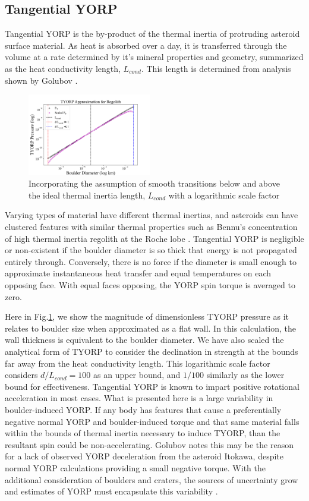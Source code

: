 \subsection{Tangential YORP}
Tangential YORP is the by-product of the thermal inertia of protruding asteroid surface material. As heat is absorbed over a day, it is transferred through the volume at a rate determined by it's mineral properties and geometry, summarized as the heat conductivity length, $L_{cond}$. This length is determined from analysis shown by Golubov \cite{Golubov2012}. 
\begin{figure}[H]
    \centering
    \includegraphics[width=0.48\textwidth]{fig/tyorp_regolith.png}
    \caption{Incorporating the assumption of smooth transitions below and above the ideal thermal inertia length, $L_{cond}$ with a logarithmic scale factor}
    \label{fig:tyorp_regolith}
\end{figure}

Varying types of material have different thermal inertias, and asteroids can have clustered features with similar thermal properties such as Bennu's concentration of high thermal inertia regolith at the Roche lobe \cite{Rozitis2020}. Tangential YORP is negligible or non-existent if the boulder diameter is so thick that energy is not propagated entirely through. Conversely, there is no force if the diameter is small enough to approximate instantaneous heat transfer and equal temperatures on each opposing face. With equal faces opposing, the YORP spin torque is averaged to zero. 

Here in Fig.\ref{fig:tyorp_regolith}, we show the magnitude of dimensionless TYORP pressure as it relates to boulder size when approximated as a flat wall. In this calculation, the wall thickness is equivalent to the boulder diameter. We have also scaled the analytical form of TYORP to consider the declination in strength at the bounds far away from the heat conductivity length. This logarithmic scale factor considers $d/L_{cond} = 100$ as an upper bound, and $1/100$ similarly as the lower bound for effectiveness.
Tangential YORP is known to impart positive rotational acceleration in most cases. What is presented here is a large variability in boulder-induced YORP. If any body has features that cause a preferentially negative normal YORP and boulder-induced torque and that same material falls within the bounds of thermal inertia necessary to induce TYORP, than the resultant spin could be non-accelerating. Golubov notes this may be the reason for a lack of observed YORP deceleration from the asteroid Itokawa, despite normal YORP calculations providing a small negative torque. With the additional consideration of boulders and craters, the sources of uncertainty grow and estimates of YORP must encapsulate this variability \cite{Golubov2012}. 


